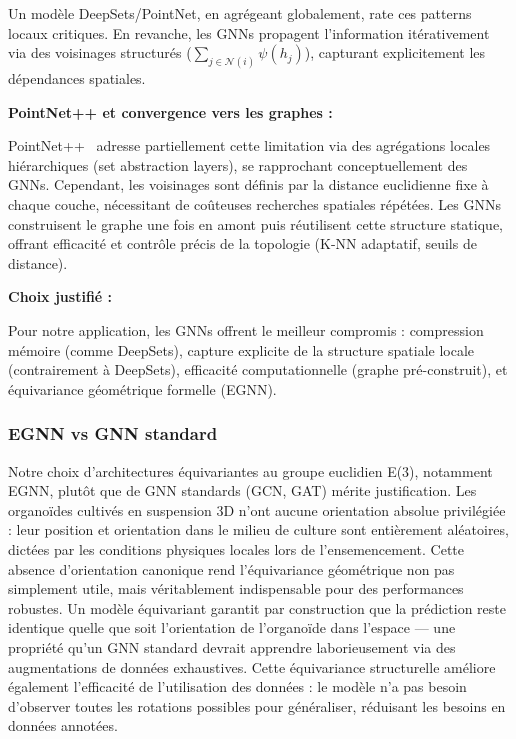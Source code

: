 Un modèle DeepSets/PointNet, en agrégeant globalement, rate ces patterns locaux critiques. En revanche, les GNNs propagent l'information itérativement via des voisinages structurés ($\sum_{j \in \mathcal{N}(i)} \psi(h_j)$), capturant explicitement les dépendances spatiales.

\textbf{PointNet++ et convergence vers les graphes :}

PointNet++~\cite{Qi2017b} adresse partiellement cette limitation via des agrégations locales hiérarchiques (set abstraction layers), se rapprochant conceptuellement des GNNs. Cependant, les voisinages sont définis par la distance euclidienne fixe à chaque couche, nécessitant de coûteuses recherches spatiales répétées. Les GNNs construisent le graphe une fois en amont puis réutilisent cette structure statique, offrant efficacité et contrôle précis de la topologie (K-NN adaptatif, seuils de distance).

\textbf{Choix justifié :}

Pour notre application, les GNNs offrent le meilleur compromis : compression mémoire (comme DeepSets), capture explicite de la structure spatiale locale (contrairement à DeepSets), efficacité computationnelle (graphe pré-construit), et équivariance géométrique formelle (EGNN).

\subsubsection{EGNN vs GNN standard}

Notre choix d'architectures équivariantes au groupe euclidien E(3), notamment EGNN, plutôt que de GNN standards (GCN, GAT) mérite justification. Les organoïdes cultivés en suspension 3D n'ont aucune orientation absolue privilégiée : leur position et orientation dans le milieu de culture sont entièrement aléatoires, dictées par les conditions physiques locales lors de l'ensemencement. Cette absence d'orientation canonique rend l'équivariance géométrique non pas simplement utile, mais véritablement indispensable pour des performances robustes. Un modèle équivariant garantit par construction que la prédiction reste identique quelle que soit l'orientation de l'organoïde dans l'espace — une propriété qu'un GNN standard devrait apprendre laborieusement via des augmentations de données exhaustives. Cette équivariance structurelle améliore également l'efficacité de l'utilisation des données : le modèle n'a pas besoin d'observer toutes les rotations possibles pour généraliser, réduisant les besoins en données annotées.

